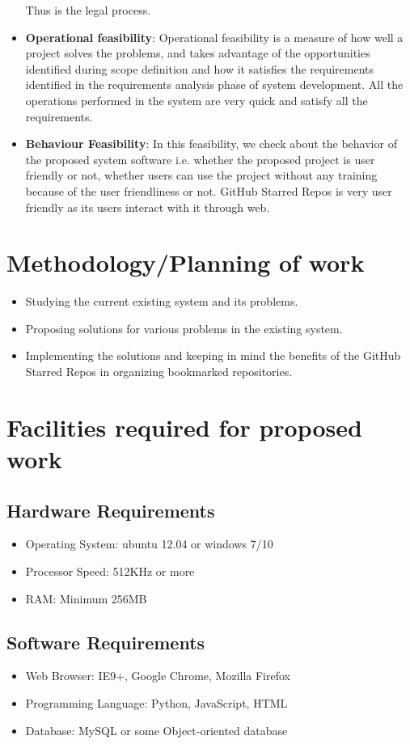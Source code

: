 \begin{itemize}
Thus is the legal process.
\item {\bf{Operational feasibility}}: Operational feasibility is a measure 
of how well a project solves the problems, and takes advantage of the 
opportunities identified during scope definition and how it satisfies 
the requirements identified in the requirements analysis phase of system 
development. All the operations performed in the system are very quick 
and satisfy all the requirements.
\item {\bf{Behaviour Feasibility}}: In this feasibility, we check about the 
behavior of the proposed system software i.e. whether the proposed 
project is user friendly or not, whether users can use the project 
without any training because of the user friendliness or not. GitHub Starred Repos is very user friendly as its users interact with it through web.
\end{itemize}



\section{Methodology/Planning of work}
\begin{itemize}
\item Studying the current existing system and its problems.
\item Proposing solutions for various problems in the existing system.
\item Implementing the solutions and keeping in     mind the benefits of the GitHub Starred Repos in organizing bookmarked repositories.
\end{itemize}




\section{Facilities required for proposed work}
\subsection{Hardware Requirements}
\begin{itemize}
\item Operating System: ubuntu 12.04 or windows 7/10
\item Processor Speed: 512KHz or more
\item RAM: Minimum 256MB
\end{itemize}
\subsection{Software Requirements}
\begin{itemize}
\item Web Browser: IE9+, Google Chrome, Mozilla Firefox
\item Programming Language: Python, JavaScript, HTML
\item Database: MySQL or some Object-oriented database
\end{itemize}










